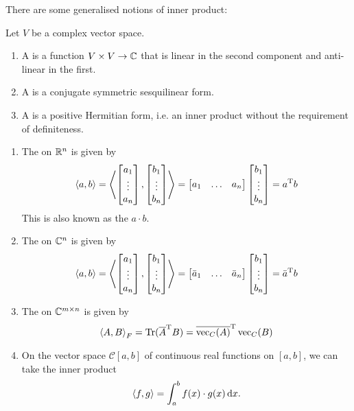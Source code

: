 There are some generalised notions of inner product:
\begin{definition}
Let $V$ be a complex vector space.
\begin{enumerate}
\item A  is a function $V\times V\to \mathbb{C}$ that is linear in the second component and anti-linear in the first.
\item A  is a conjugate symmetric sesquilinear form.
\item A  is a positive Hermitian form, i.e. an inner product without the requirement of definiteness.
\end{enumerate}
\end{definition}

\begin{example}
\begin{enumerate}
\item The  on $\mathbb{R}^n$ is given by
\[ \left\langle a,b \right\rangle = \left\langle \begin{bmatrix}
a_1 \\ \vdots \\ a_n
\end{bmatrix},\begin{bmatrix}
b_1 \\ \vdots \\ b_n
\end{bmatrix} \right\rangle = \begin{bmatrix}
a_1 & \hdots & a_n
\end{bmatrix}\begin{bmatrix}
b_1 \\ \vdots \\ b_n
\end{bmatrix} = a^{\mathrm{T}} b \]
This is also known as the  $a\cdot b$.
\item The  on $\mathbb{C}^n$ is given by
\[ \left\langle a,b \right\rangle = \left\langle \begin{bmatrix}
a_1 \\ \vdots \\ a_n
\end{bmatrix},\begin{bmatrix}
b_1 \\ \vdots \\ b_n
\end{bmatrix} \right\rangle = \begin{bmatrix}
\bar{a}_1 & \hdots & \bar{a}_n
\end{bmatrix}\begin{bmatrix}
b_1 \\ \vdots \\ b_n
\end{bmatrix} = \bar{a}^{\mathrm{T}} b \]
\item The  on $\mathbb{C}^{m\times n}$ is given by
\[ \left\langle A,B \right\rangle_F =  \operatorname{Tr}(\overline{A}^{\mathrm{T}} B) = \overline{\operatorname{vec}_C(A)}^{\mathrm{T}} \operatorname{vec}_C(B)\]
\item On the vector space $\mathcal{C}[a,b]$ of continuous real functions on $[a,b]$, we can take the inner product
\[ \left\langle f,g \right\rangle = \int_a^b f(x)\cdot g(x) \operatorname{d \!}{x}. \]
\end{enumerate}
\end{example}
